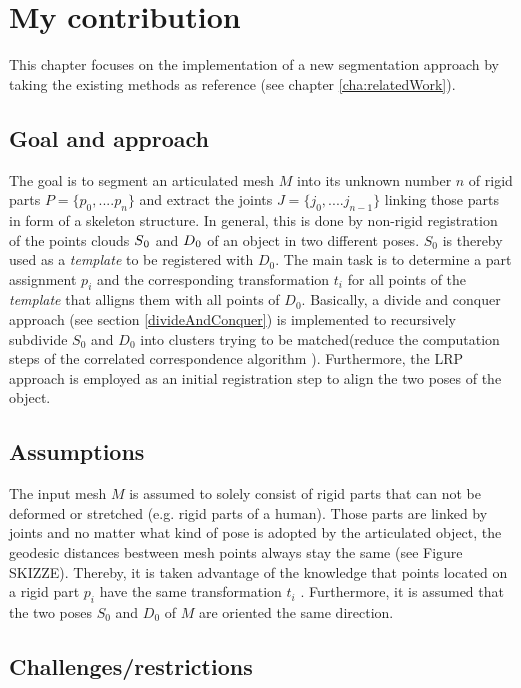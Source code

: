 \chapter{My contribution}
\label{cha:MyContribution}

This chapter focuses on the implementation of a new segmentation approach by taking the existing methods as reference (see chapter \ref{cha:relatedWork}). 

\section{Goal and approach}

The goal is to segment an articulated mesh $M$ into its unknown number $n$ of rigid parts $ P =  \{ {p_0,....p_n}\}$ and extract the joints $ J =  \{ {j_0,....j_{n-1}}\}$ linking those parts in form of a skeleton structure. In general, this is done by non-rigid registration of the points clouds $S\textsubscript{0}$ and $D\textsubscript{0}$ of an object in two different poses. $S_0$ is thereby used as a \textit{template} to be registered with $D_0$. The main task is to determine a part assignment $p_i$ and the corresponding transformation $t_i$ for all points of the \textit{template} that alligns them with all points of $D_0$. Basically, a divide and conquer approach (see section \ref{divideAndConquer}) is implemented to recursively subdivide $S_0$ and $D_0$ into clusters trying to be matched(reduce the computation steps of the correlated correspondence algorithm \cite{Anguelov04}). Furthermore, the LRP approach \cite{correspondence} is employed as an initial registration step to align the two poses of the object. 

\section{Assumptions}

The input mesh $M$ is assumed to solely consist of rigid parts that can not be deformed or stretched (e.g. rigid parts of a human). Those parts are linked by joints and no matter what kind of pose is adopted by the articulated object, the geodesic distances bestween mesh points always stay the same (see Figure SKIZZE).  Thereby, it is taken advantage of the knowledge that points located on a rigid part $p_i$ have the same transformation $t_i$ . Furthermore, it is assumed that the two poses $S_0$ and $D_0$ of $M$ are oriented the same direction.

\section{Challenges/restrictions}


